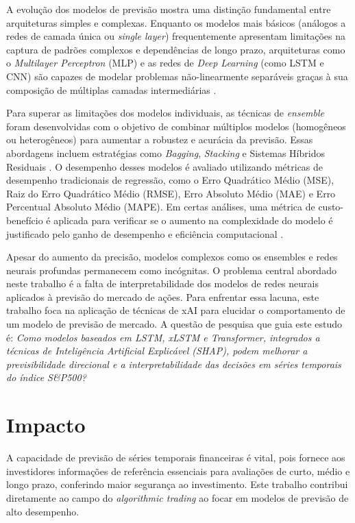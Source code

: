 A evolução dos modelos de previsão mostra uma distinção fundamental entre arquiteturas simples e complexas. Enquanto os modelos mais básicos (análogos a redes de camada única ou \textit{single layer}) frequentemente apresentam limitações na captura de padrões complexos e dependências de longo prazo, arquiteturas como o \textit{Multilayer Perceptron} (MLP) e as redes de \textit{Deep Learning} (como LSTM e CNN) são capazes de modelar problemas não-linearmente separáveis graças à sua composição de múltiplas camadas intermediárias \cite{Ferro2024AvaliacaoEnsemble}.

Para superar as limitações dos modelos individuais, as técnicas de \textit{ensemble} foram desenvolvidas com o objetivo de combinar múltiplos modelos (homogêneos ou heterogêneos) para aumentar a robustez e acurácia da previsão. Essas abordagens incluem estratégias como \textit{Bagging}, \textit{Stacking} e Sistemas Híbridos Residuais \cite{Ferro2024AvaliacaoEnsemble}. O desempenho desses modelos é avaliado utilizando métricas de desempenho tradicionais de regressão, como o Erro Quadrático Médio (MSE), Raiz do Erro Quadrático Médio (RMSE), Erro Absoluto Médio (MAE) e Erro Percentual Absoluto Médio (MAPE). Em certas análises, uma métrica de custo-benefício é aplicada para verificar se o aumento na complexidade do modelo é justificado pelo ganho de desempenho e eficiência computacional \cite{Dametto2018EstudoRN}.

Apesar do aumento da precisão, modelos complexos como os ensembles e redes neurais profundas permanecem como incógnitas. O problema central abordado neste trabalho é a falta de interpretabilidade dos modelos de redes neurais aplicados à previsão do mercado de ações. Para enfrentar essa lacuna, este trabalho foca na aplicação de técnicas de xAI para elucidar o comportamento de um modelo de previsão de mercado. A questão de pesquisa que guia este estudo é: \textit{Como modelos baseados em LSTM, xLSTM e Transformer, integrados a técnicas de Inteligência Artificial Explicável (SHAP), podem melhorar a previsibilidade direcional e a interpretabilidade das decisões em séries temporais do índice S\&P500?}


\section{Impacto}

A capacidade de previsão de séries temporais financeiras é vital, pois fornece aos investidores informações de referência essenciais para avaliações de curto, médio e longo prazo, conferindo maior segurança ao investimento. Este trabalho contribui diretamente ao campo do \textit{algorithmic trading} ao focar em modelos de previsão de alto desempenho.

